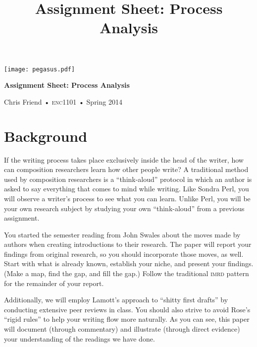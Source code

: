\documentclass[10pt, oneside]{amsart}	%
\title[Process Analysis]{Assignment Sheet: Process Analysis}
\begin{document}
%
\thispagestyle{empty}
\vspace{-2in}
\begin{center}
\huge
\texttt{[image: pegasus.pdf]}

\textbf{Assignment Sheet: Process Analysis}

{\normalsize Chris Friend • \textsc{enc1101} • Spring 2014}
\end{center}
\vspace{1.5\baselineskip}

\section{Background} %
\label{sec:background}
If the writing process takes place exclusively inside the head of the writer, how can composition researchers learn how other people write? A traditional method used by composition researchers is a “think-aloud” protocol in which an author is asked to say everything that comes to mind while writing. Like Sondra Perl, you will observe a writer's process to see what you can learn. Unlike Perl, you will be your own research subject by studying your own “think-aloud” from a previous assignment.

You started the semester reading from John Swales about the moves made by authors when creating introductions to their research. The paper will report your findings from original research, so you should incorporate those moves, as well. Start with what is already known, establish your niche, and present your findings. (Make a map, find the gap, and fill the gap.) Follow the traditional \textsc{imrd} pattern for the remainder of your report.

Additionally, we will employ Lamott's approach to “shitty first drafts” by conducting extensive peer reviews in class. You should also strive to avoid Rose's “rigid rules” to help your writing flow more naturally. As you can see, this paper will document (through commentary) and illustrate (through direct evidence) your understanding of the readings we have done.

\begin{comment}
	\section{Purpose} %
	\label{sec:purpose}
	\begin{itemize}
		\item To better understand yourself as a writer
		\item To relate your writing process with the processes of others we have read about
		\item To practice writing in an academic genre
		\item To use the \textsc{cars} and \textsc{imrd} models in your writing, where appropriate
		\item To understand research as a process of genuine inquiry
	\end{itemize}
\end{comment}
\end{document}
